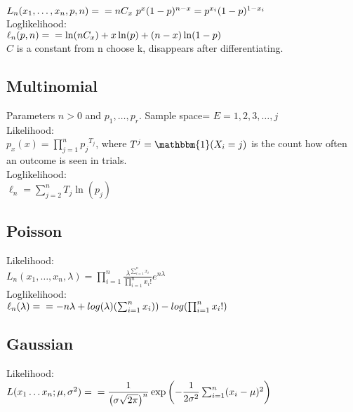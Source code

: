 $L_ n(x_1, \ldots , x_ n, p,n) =\\
= nC_x~p^x(1-p)^{n-x} = p^{x_i}(1-p)^{1-x_i}$\\

Loglikelihood:\\

$\ell_n (p,n)  = \\
 = \ln(nC_x)+x\ln(p)+(n-x)\ln(1-p)$\\
 
$C$ is a constant from n choose k, disappears after differentiating.


\subsection*{Multinomial}

Parameters $n>0$ and $p_1, \ldots, p_r$. Sample space= $E={1,2,3,\ldots,j}$\\

Likelihood:\\

$p_x(x)= \prod _{j=1}^{n}{p_{{j}}}^{T_{{j}}}$, where $T^j=\mathbbm{1}( X_i=j)$ is the count how often an outcome is seen in trials. \\

Loglikelihood:\\
$\ell_n= \sum _{j=2}^{n}T_{{j}}\ln  \left( p_{{j}} \right)$\\

\subsection*{Poisson}
Likelihood:\\
$L_ n(x_1, \ldots , x_ n, \lambda) = \prod _{i = 1}^ n \frac{\lambda^{\sum_{i=1}^{n} x_i}}{\prod _{i = 1}^ n x_i!} e^{n\lambda}$\\

Loglikelihood:\\
$\ell_n (\lambda)= \\
= -n\lambda + log(\lambda)(\sum_{i=1}^n x_i)) - log(\prod _{i = 1}^ n x_i!)$


\subsection*{Gaussian}

Likelihood:\\

$L(x_1\dots x_n;\mu,\sigma^2)=\\ 
= \dfrac{1}{\left(\sigma\sqrt{2\pi}\right)^n}\exp{\left(-\dfrac{1}{2\sigma^2}\sum_{i=1}^n (x_i-\mu)^2 \right)}$\\

